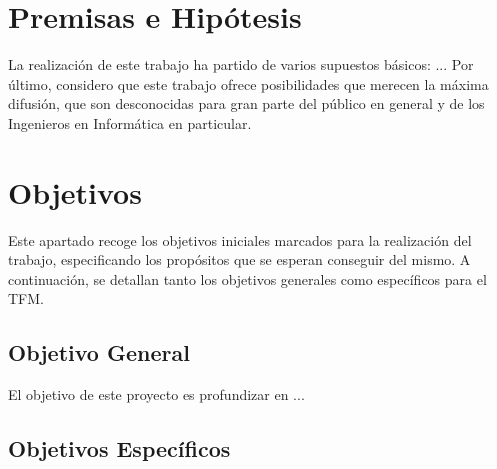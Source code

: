 \section{Premisas e Hipótesis}


La realización de este trabajo ha partido de varios supuestos básicos: ... Por último, considero que este trabajo ofrece posibilidades que merecen la máxima difusión, que son desconocidas para gran parte del público en general y de los Ingenieros en Informática en particular.


\section{Objetivos}


Este apartado recoge los objetivos iniciales marcados para la realización del trabajo, especificando los propósitos que se esperan conseguir del mismo. A continuación, se detallan tanto los objetivos generales como específicos para el TFM.

\subsection{Objetivo General}

El objetivo de este proyecto es profundizar en ...

\subsection{Objetivos Específicos}


